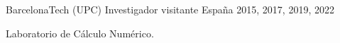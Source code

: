 \begin{cventries}
  
  \cventry
    {BarcelonaTech (UPC)}
    {Investigador visitante}
    {España}
    {2015, 2017, 2019, 2022}
    {
      \begin{cvitems} %
        \item {Laboratorio de Cálculo Numérico.}
      \end{cvitems}
    }
 
  
    




\end{cventries}

